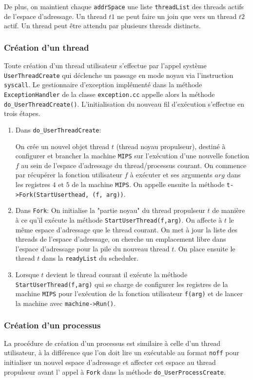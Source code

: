 \documentclass[11pt]{article}
\theoremstyle{definition}
\theoremstyle{definition}
\begin{document}
De plus, on maintient chaque \texttt{addrSpace} une liste \texttt{threadList} des threads actifs de l'espace d'adressage.
Un thread $t1$ ne peut faire un join que vers un thread $t2$ actif.
Un thread peut être attendu par plusieurs threads distincts.

\subsubsection{Création d'un thread}
Toute création d'un thread utilisateur s'effectue par l'appel système
\texttt{UserThreadCreate}
qui déclenche un passage en mode noyau via l'instruction \texttt{syscall}.
Le gestionnaire d'exception implémenté dans la méthode \texttt{ExceptionHandler} de la classe
\texttt{exception.cc} appelle alors la méthode \texttt{do\_UserThreadCreate()}.
L'initialisation du nouveau fil d'exécution s'effectue en trois étapes.

\begin{enumerate}
\item Dans \texttt{do\_UserThreadCreate}:

On crée un nouvel objet thread $t$ (thread noyau propulseur), destiné à configurer et brancher la machine \texttt{MIPS} sur l'exécution d'une nouvelle fonction $f$ au sein de l'espace d'adressage du thread/processus courant.
On commence par récupérer la fonction utilisateur $f$ à exécuter et ses arguments $arg$ dans les registres $4$ et $5$ de la machine \texttt{MIPS}. On appelle ensuite la méthode \texttt{t->Fork(StartUserthead, (f, arg))}.

\item Dans \texttt{Fork}:
On initialise la "partie noyau" du thread propulseur $t$ de manière
à ce qu'il exécute la méthode \texttt{StartUserThread(f,arg)}. On affecte à $t$ le même espace d'adressage que le thread courant. On met à jour la liste des threads de l'espace d'adressage, on cherche un emplacement
libre dans l'espace d'adressage pour la pile du nouveau thread $t$.
On place ensuite le thread $t$ dans la \texttt{readyList} du scheduler.

\item Lorsque $t$ devient le thread courant il exécute la méthode \texttt{StartUserThread(f,arg)}
qui se charge de configurer les registres de la machine \texttt{MIPS} pour l'exécution
de la fonction utilisateur \texttt{f(arg)} et de lancer la machine avec \texttt{machine->Run()}. 
\end{enumerate}

\subsubsection{Création d'un processus}
La procédure de création d'un processus est similaire à celle d'un thread utilisateur, à la différence que l'on doit lire un exécutable au format \texttt{noff} pour initialiser un nouvel espace d'adressage et affecter cet espace au thread propulseur avant l' appel à \texttt{Fork} dans la méthode \texttt{do_UserProcessCreate}.
\end{document}
